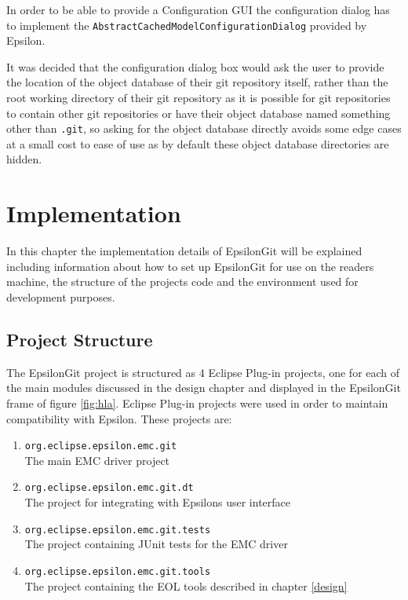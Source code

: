 \documentclass[11pt]{book}
\newcommand{\code}[1]{\texttt{#1}}
\begin{document}
In order to be able to provide a Configuration GUI the configuration dialog has to implement the \code{AbstractCachedModelConfigurationDialog} provided by Epsilon.

It was decided that the configuration dialog box would ask the user to provide the location of the object database of their git repository itself, rather than the root working directory of their git repository as it is possible for git repositories to contain other git repositories or have their object database named something other than \code{.git}, so asking for the object database directly avoids some edge cases at a small cost to ease of use as by default these object database directories are hidden.

\chapter{Implementation}
In this chapter the implementation details of EpsilonGit will be explained including information about how to set up EpsilonGit for use on the readers machine, the structure of the projects code and the environment used for development purposes.

\section{Project Structure}
The EpsilonGit project is structured as 4 Eclipse Plug-in projects, one for each of the main modules discussed in the design chapter and displayed in the EpsilonGit frame of figure \ref{fig:hla}. Eclipse Plug-in projects were used in order to maintain compatibility with Epsilon. These projects are:

\begin{enumerate}
	\item \code{org.eclipse.epsilon.emc.git} \\ The main EMC driver project
	\item \code{org.eclipse.epsilon.emc.git.dt} \\ The project for integrating with Epsilons user interface 
	\item \code{org.eclipse.epsilon.emc.git.tests} \\ The project containing JUnit tests for the EMC driver
	\item \code{org.eclipse.epsilon.emc.git.tools} \\ The project containing the EOL tools described in chapter \ref{design}
\end{enumerate}
\end{document}
